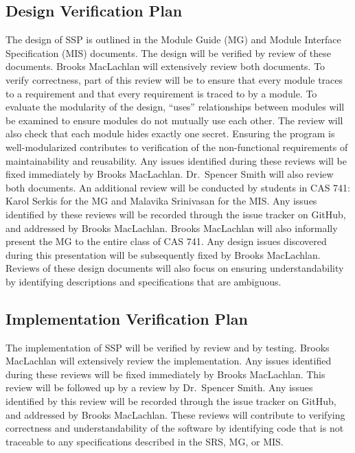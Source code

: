 \documentclass[12pt, titlepage]{article}
\newcommand{\progname}{SSP}
\begin{document}
\subsection{Design Verification Plan}

\noindent The design of \progname{} is outlined in the Module Guide (MG) and 
Module Interface Specification (MIS) documents. The design will be verified by 
review of these documents. Brooks MacLachlan will extensively review both 
documents. To verify correctness, part of this review will be to ensure that 
every module traces to a requirement and that every requirement is traced to by 
a module. To evaluate the modularity of the design, ``uses'' relationships 
between modules will be examined to ensure modules do not mutually use each 
other. The review will also check that each module hides exactly one secret. 
Ensuring the program is well-modularized contributes to verification of the 
non-functional requirements of maintainability and reusability. Any issues 
identified during these reviews will be fixed immediately by Brooks MacLachlan. 
Dr.~Spencer Smith will also review both documents. An additional review will be 
conducted by students in CAS 741: Karol Serkis for the MG and Malavika 
Srinivasan for the MIS. Any issues identified by these reviews will be recorded 
through the issue tracker on GitHub, and addressed by Brooks 
MacLachlan. Brooks MacLachlan will also informally present the MG to the entire 
class of CAS 741. Any design issues discovered during this presentation will be 
subsequently fixed by Brooks MacLachlan. Reviews of these design documents will 
also focus on ensuring understandability by identifying descriptions and 
specifications that are ambiguous.



\subsection{Implementation Verification Plan} \label{sec_ImpPlan}

\noindent The implementation of \progname{} will be verified by review and by 
testing. Brooks MacLachlan will extensively review the implementation. Any 
issues identified during these reviews will be fixed immediately by Brooks 
MacLachlan. This review will be followed up by a review by Dr.~Spencer Smith. 
Any  issues identified by this review will be recorded through the issue 
tracker on GitHub, and addressed by Brooks MacLachlan. These reviews will 
contribute to verifying correctness and understandability of the software by 
identifying code that is not traceable to any specifications described in the 
SRS, MG, or MIS.
\newline
\end{document}
